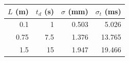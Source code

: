 \begin{tabular}{rrrr}
\toprule
$L$ (m) & $t_d$ (s) & $\sigma$ (mm) & $\sigma_t$ (ms) \\
\midrule
0.1 & 1 & 0.503 & 5.026 \\
0.75 & 7.5 & 1.376 & 13.765 \\
1.5 & 15 & 1.947 & 19.466 \\
\bottomrule
\end{tabular}
